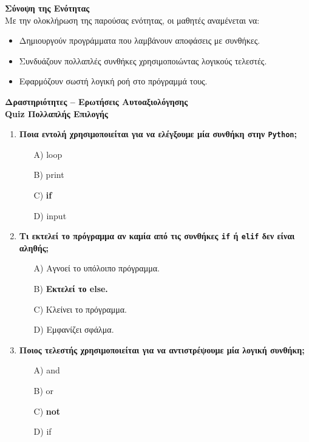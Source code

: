 \documentclass[11pt]{report}
\begin{document}
\vspace{1em}
\textbf{Σύνοψη της Ενότητας} \\[0.5em]
Με την ολοκλήρωση της παρούσας ενότητας, οι μαθητές αναμένεται να:

\begin{itemize}
    \item Δημιουργούν προγράμματα που λαμβάνουν αποφάσεις με συνθήκες.
    \item Συνδυάζουν πολλαπλές συνθήκες χρησιμοποιώντας λογικούς τελεστές.
    \item Εφαρμόζουν σωστή λογική ροή στο πρόγραμμά τους.
\end{itemize}

\vspace{1em}
\textbf{Δραστηριότητες – Ερωτήσεις Αυτοαξιολόγησης} \\[0.5em]
\textbf{Quiz Πολλαπλής Επιλογής}
\begin{enumerate}
    \item \textbf{Ποια εντολή χρησιμοποιείται για να ελέγξουμε μία συνθήκη στην \texttt{Python};}
    \begin{itemize}
        \item[A)] loop
        \item[B)] print
        \item[C)] \textbf{if}
        \item[D)] input
    \end{itemize}

    \item \textbf{Τι εκτελεί το πρόγραμμα αν καμία από τις συνθήκες \texttt{if} ή \texttt{elif} δεν είναι αληθής;}
    \begin{itemize}
        \item[A)] Αγνοεί το υπόλοιπο πρόγραμμα.
        \item[B)] \textbf{Εκτελεί το else.}
        \item[C)] Κλείνει το πρόγραμμα.
        \item[D)] Εμφανίζει σφάλμα.
    \end{itemize}

    \item \textbf{Ποιος τελεστής χρησιμοποιείται για να αντιστρέψουμε μία λογική συνθήκη;}
    \begin{itemize}
        \item[A)] and
        \item[B)] or
        \item[C)] \textbf{not}
        \item[D)] if
    \end{itemize}
\end{enumerate}
\end{document}
